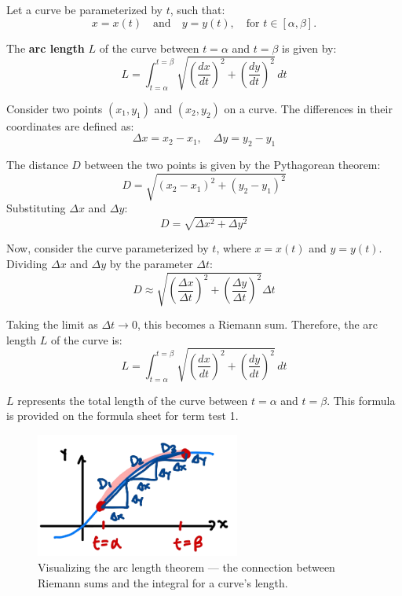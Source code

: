 \documentclass{article}
\begin{document}
\begin{theorembox}

    Let a curve be parameterized by \( t \), such that:
    \[
    x = x(t) \quad \text{and} \quad y = y(t), \quad \text{for } t \in [\alpha, \beta].
    \]
    
    The \textbf{arc length} \( L \) of the curve between \( t = \alpha \) and \( t = \beta \) is given by:
    \[
        L = \int_{t=\alpha}^{t=\beta} \sqrt{\left(\frac{dx}{dt}\right)^2 + \left(\frac{dy}{dt}\right)^2} \, dt
    \]

\begin{conceptbox}
Consider two points \( (x_1, y_1) \) and \( (x_2, y_2) \) on a curve. The differences in their coordinates are defined as:
\[ \Delta x = x_2 - x_1, \quad \Delta y = y_2 - y_1 \]

The distance \( D \) between the two points is given by the Pythagorean theorem:
\[
    D = \sqrt{(x_2 - x_1)^2 + (y_2 - y_1)^2}
\]
Substituting \( \Delta x \) and \( \Delta y \):
\[
    D = \sqrt{\Delta x^2 + \Delta y^2}
\]

Now, consider the curve parameterized by \( t \), where \( x = x(t) \) and \( y = y(t) \). Dividing \( \Delta x \) and \( \Delta y \) by the parameter \( \Delta t \):
\[
    D \approx \sqrt{\left(\frac{\Delta x}{\Delta t}\right)^2 + \left(\frac{\Delta y}{\Delta t}\right)^2} \Delta t
\]

Taking the limit as \( \Delta t \to 0 \), this becomes a Riemann sum. Therefore, the arc length \( L \) of the curve is:
\[
    L = \int_{t=\alpha}^{t=\beta} \sqrt{\left(\frac{dx}{dt}\right)^2 + \left(\frac{dy}{dt}\right)^2} \, dt
\]
\end{conceptbox}

\begin{notebox}
    \( L \) represents the total length of the curve between \( t = \alpha \) and \( t = \beta \). This formula is provided on the formula sheet for term test 1.
\end{notebox}
\end{theorembox}

\begin{illustrationbox}
    \begin{figure}[H]
        \centering
        \includegraphics[width=0.6\textwidth]{arc length riemann sums showcase}
        \caption{Visualizing the arc length theorem — the connection between Riemann sums and the integral for a curve's length.}
        \label{fig:sample_image1}
    \end{figure}
\end{illustrationbox}
\end{document}
